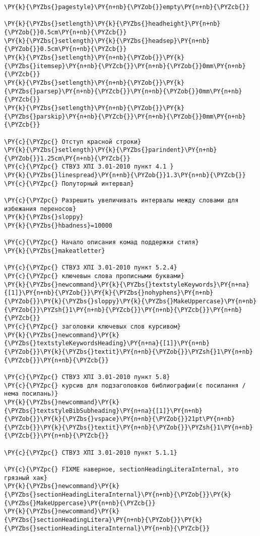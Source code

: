 \begin{Verbatim}[commandchars=\\\{\}]
\PY{k}{\PYZbs{}pagestyle}\PY{n+nb}{\PYZob{}}empty\PY{n+nb}{\PYZcb{}}

\PY{k}{\PYZbs{}setlength}\PY{k}{\PYZbs{}headheight}\PY{n+nb}{\PYZob{}}0.5cm\PY{n+nb}{\PYZcb{}}
\PY{k}{\PYZbs{}setlength}\PY{k}{\PYZbs{}headsep}\PY{n+nb}{\PYZob{}}0.5cm\PY{n+nb}{\PYZcb{}}
\PY{k}{\PYZbs{}setlength}\PY{n+nb}{\PYZob{}}\PY{k}{\PYZbs{}itemsep}\PY{n+nb}{\PYZcb{}}\PY{n+nb}{\PYZob{}}0mm\PY{n+nb}{\PYZcb{}}
\PY{k}{\PYZbs{}setlength}\PY{n+nb}{\PYZob{}}\PY{k}{\PYZbs{}parsep}\PY{n+nb}{\PYZcb{}}\PY{n+nb}{\PYZob{}}0mm\PY{n+nb}{\PYZcb{}}
\PY{k}{\PYZbs{}setlength}\PY{n+nb}{\PYZob{}}\PY{k}{\PYZbs{}parskip}\PY{n+nb}{\PYZcb{}}\PY{n+nb}{\PYZob{}}0mm\PY{n+nb}{\PYZcb{}}

\PY{c}{\PYZpc{} Отступ красной строки}
\PY{k}{\PYZbs{}setlength}\PY{k}{\PYZbs{}parindent}\PY{n+nb}{\PYZob{}}1.25cm\PY{n+nb}{\PYZcb{}}
\PY{c}{\PYZpc{} СТВУЗ ХПІ 3.01-2010 пункт 4.1 }
\PY{k}{\PYZbs{}linespread}\PY{n+nb}{\PYZob{}}1.3\PY{n+nb}{\PYZcb{}} \PY{c}{\PYZpc{} Полуторный интервал}

\PY{c}{\PYZpc{} Разрешить увеличивать интервалы между словами для избежания переносов}
\PY{k}{\PYZbs{}sloppy}
\PY{k}{\PYZbs{}hbadness}=10000 

\PY{c}{\PYZpc{} Начало описания комад поддержки стиля}
\PY{k}{\PYZbs{}makeatletter}

\PY{c}{\PYZpc{} СТВУЗ ХПІ 3.01-2010 пункт 5.2.4}
\PY{c}{\PYZpc{} ключевын слова прописными буквами}
\PY{k}{\PYZbs{}newcommand}\PY{k}{\PYZbs{}textstyleKeywords}\PY{n+na}{[1]}\PY{n+nb}{\PYZob{}}\PY{k}{\PYZbs{}nohyphens}\PY{n+nb}{\PYZob{}}\PY{k}{\PYZbs{}sloppy}\PY{k}{\PYZbs{}MakeUppercase}\PY{n+nb}{\PYZob{}}\PYZsh{}1\PY{n+nb}{\PYZcb{}}\PY{n+nb}{\PYZcb{}}\PY{n+nb}{\PYZcb{}}
\PY{c}{\PYZpc{} заголовки ключевых слов курсивом}
\PY{k}{\PYZbs{}newcommand}\PY{k}{\PYZbs{}textstyleKeywordsHeading}\PY{n+na}{[1]}\PY{n+nb}{\PYZob{}}\PY{k}{\PYZbs{}textit}\PY{n+nb}{\PYZob{}}\PYZsh{}1\PY{n+nb}{\PYZcb{}}\PY{n+nb}{\PYZcb{}}

\PY{c}{\PYZpc{} СТВУЗ ХПІ 3.01-2010 пункт 5.8}
\PY{c}{\PYZpc{} курсив для подзаголовков библиографии(є посилання / нема посилань)}
\PY{k}{\PYZbs{}newcommand}\PY{k}{\PYZbs{}textstyleBibSubheading}\PY{n+na}{[1]}\PY{n+nb}{\PYZob{}}\PY{k}{\PYZbs{}vspace}\PY{n+nb}{\PYZob{}}21pt\PY{n+nb}{\PYZcb{}}\PY{k}{\PYZbs{}textit}\PY{n+nb}{\PYZob{}}\PYZsh{}1\PY{n+nb}{\PYZcb{}}\PY{n+nb}{\PYZcb{}}

\PY{c}{\PYZpc{} СТВУЗ ХПІ 3.01-2010 пункт 5.1.1}

\PY{c}{\PYZpc{} FIXME наверное, sectionHeadingLiteraInternal, это грязный хак}
\PY{k}{\PYZbs{}newcommand}\PY{k}{\PYZbs{}sectionHeadingLiteraInternal}\PY{n+nb}{\PYZob{}}\PY{k}{\PYZbs{}MakeUppercase}\PY{n+nb}{\PYZcb{}}
\PY{k}{\PYZbs{}newcommand}\PY{k}{\PYZbs{}sectionHeadingLitera}\PY{n+nb}{\PYZob{}}\PY{k}{\PYZbs{}sectionHeadingLiteraInternal}\PY{n+nb}{\PYZcb{}}


\end{Verbatim}
